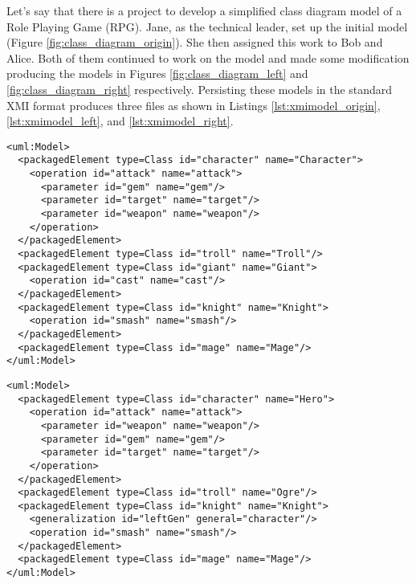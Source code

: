 Let's say that there is a project to develop a simplified class diagram model of a Role Playing Game (RPG). Jane, as the technical leader, set up the initial model (Figure \ref{fig:class_diagram_origin}). She then assigned this work to Bob and Alice. Both of them continued to work on the model and made some modification producing the models in Figures \ref{fig:class_diagram_left} and \ref{fig:class_diagram_right} respectively. Persisting these models in the standard XMI \cite{omg2018xmi} format produces three files as shown in Listings \ref{lst:xmimodel_origin}, \ref{lst:xmimodel_left}, and \ref{lst:xmimodel_right}.

\vspace{-20pt}
\begin{lstlisting}[style=xmi,caption={Simplified XMI file of the original version in Figure \ref{fig:class_diagram_origin}.},label=lst:xmimodel_origin]
<uml:Model>
  <packagedElement type=Class id="character" name="Character">
    <operation id="attack" name="attack">
      <parameter id="gem" name="gem"/>
      <parameter id="target" name="target"/>
      <parameter id="weapon" name="weapon"/>
    </operation>
  </packagedElement>
  <packagedElement type=Class id="troll" name="Troll"/>
  <packagedElement type=Class id="giant" name="Giant">
    <operation id="cast" name="cast"/>
  </packagedElement>
  <packagedElement type=Class id="knight" name="Knight">
    <operation id="smash" name="smash"/>
  </packagedElement>
  <packagedElement type=Class id="mage" name="Mage"/>
</uml:Model>
\end{lstlisting}

\vspace{-20pt}
\begin{lstlisting}[style=xmi,caption={Simplified XMI file of the left version in Figure \ref{fig:class_diagram_left}.},label=lst:xmimodel_left]
<uml:Model>
  <packagedElement type=Class id="character" name="Hero">
    <operation id="attack" name="attack">
      <parameter id="weapon" name="weapon"/>
      <parameter id="gem" name="gem"/>
      <parameter id="target" name="target"/>
    </operation>  
  </packagedElement>
  <packagedElement type=Class id="troll" name="Ogre"/>
  <packagedElement type=Class id="knight" name="Knight">
    <generalization id="leftGen" general="character"/>
    <operation id="smash" name="smash"/>
  </packagedElement>
  <packagedElement type=Class id="mage" name="Mage"/>
</uml:Model>
\end{lstlisting}

